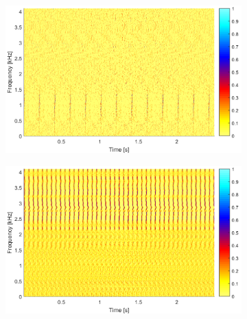 \begin{figure}[!ht]
    \centering
    \begin{subfigure}[b]{0.49\textwidth}
        \centering
        \captionsetup{skip=0.01pt}
        \caption{}
        \includegraphics[width=\textwidth]{wykresy/chapter_application/semi_blind/wagi_simulated_5.png}
        \label{fig:chapter7/semi_blind/wagi_sim_5}
    \end{subfigure}
\vspace{-1\baselineskip}
    \begin{subfigure}[b]{0.49\textwidth}
        \centering
        \captionsetup{skip=0.01pt}
        \caption{}
        \includegraphics[width=\textwidth]{wykresy/chapter_application/semi_blind/wagi_simulated_17.png}
        \label{fig:chapter7/semi_blind/wagi_sim_17}
    \end{subfigure}
\vspace{-1\baselineskip} 
    \begin{subfigure}[b]{0.49\textwidth}

\end{subfigure}
\end{figure}
